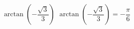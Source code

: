  {$\arctan \left( -\dfrac{\sqrt{3}}{3} \right)$}
{ $\arctan \left( -\dfrac{\sqrt{3}}{3} \right) = -\dfrac{\pi}{6}$}
